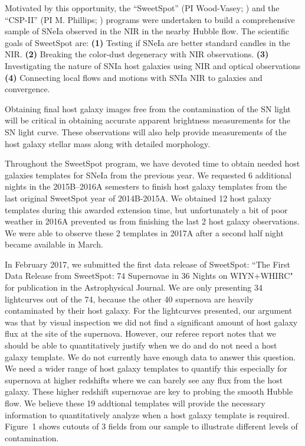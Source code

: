 \documentclass[11pt]{article}
\begin{document}
Motivated by this opportunity, the ``SweetSpot'' (PI Wood-Vasey; \cite{weyant14}) and the ``CSP-II'' (PI M. Phillips; \cite{contreras10,stritzinger11}) programs were undertaken to build a comprehensive sample of SNeIa observed in the NIR in the nearby Hubble flow.
The scientific goals of SweetSpot are:
{\bf (1)}
Testing if SNeIa are better standard candles in the NIR.
{\bf (2)}
Breaking the color-dust degeneracy with NIR observations.
{\bf (3)}
Investigating the nature of SNIa host galaxies using NIR and optical observations
{\bf (4)}
Connecting local flows and motions with SNIa NIR to galaxies and convergence.

Obtaining final host galaxy images free from the contamination of the SN light will be critical in obtaining accurate apparent brightness measurements for the SN light curve.  These observations will also help provide measurements of the host galaxy stellar mass along with detailed morphology.

Throughout the SweetSpot program, we have devoted time to obtain needed host galaxies templates for SNeIa from the previous year.  
We requested 6 additional nights in the 2015B--2016A semesters to finish host galaxy templates from the last original SweetSpot year of 2014B-2015A.  
We obtained 12 host galaxy templates during this awarded extension time, but unfortunately a bit of poor weather in 2016A prevented us from finishing the last 2 host galaxy observations.
We were able to observe these 2 templates in 2017A after a second half night became available in March.

In February 2017, we submitted the first data release of SweetSpot: ``The First Data Release from SweetSpot: 74 Supernovae in 36 Nights on WIYN+WHIRC"\cite{weyant17} for publication in the Astrophysical Journal. 
We are only presenting 34 lightcurves out of the 74, because the other 40 supernova are heavily contaminated by their host galaxy. 
For the lightcurves presented, our argument was that by visual inspection we did not find a significant amount of host galaxy flux at the site of the supernova.
However, our referee report notes that we should be able to quantitatively justify when we do and do not need a host galaxy template. 
We do not currently have enough data to answer this question. 
We need a wider range of host galaxy templates to quantify this especially for supernova at higher redshifts where we can barely see any flux from the host galaxy.
These higher redshift supernovae are key to probing the smooth Hubble flow.
We believe these 19 addtional templates will provide the necessary information to quantitatively analyze when a host galaxy template is required. 
Figure~1 shows cutouts of 3 fields from our sample to illustrate different levels of contamination.  
\end{document}
